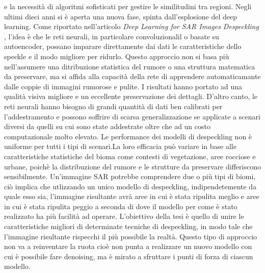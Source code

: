 e la necessità di algoritmi sofisticati per gestire le similitudini tra regioni. Negli ultimi dieci 
anni si è aperta una nuova fase, spinta dall'esplosione del deep learning. Come riportato nell'articolo 
\textit{Deep Learning for SAR Images Despeckling} \cite{DL_SAR}, l'idea è che le reti neurali, in 
particolare convoluzionalil o basate su autoencoder, possano imparare direttamente dai dati le caratteristiche
dello speckle e il modo migliore per ridurlo. Questo approccio non si basa più nell'assumere una ditribuzione 
statistica del rumore o una struttura matematica da preservare, ma si affida alla capacità della rete di 
apprendere automaticamante dalle coppie di immagini rumorose e pulite. I risultati hanno portato ad una qualità 
visiva migliore e un eccellente preservazione dei dettagli. D'altro canto, le reti neurali hanno bisogno 
di grandi quantità di dati ben calibrati per l'addestramento e possono soffrire di scarsa generalizzazione se 
applicate a scenari diversi da quelli su cui sono state addestrate oltre che ad un costo computazionale molto elevato. Le performance dei modelli di despeckling non è uniforme per tutti i tipi di scenari.La loro efficacia può variare
in base alle caratteristiche statistiche del bioma come contesti di vegetazione, aree rocciose e urbane, 
poichè la distribuzione del rumore e le strutture da preservare differiscono sensibilmente. Un'immagine SAR potrebbe 
comprendere due o più tipi di biomi, ciò implica che utlizzando un unico modello di despeckling, 
indipendetemente da quale esso sia, l'immagine risultante avrà aree in cui è stata ripulita meglio e aree in cui è 
stata ripulita peggio a seconda di dove il modello per come è stato realizzato ha più facilità ad operare.
L'obiettivo della tesi è quello di unire le caratteristiche migliori di determinate tecniche di despeckling, 
in modo tale che l'immagine risultante rispecchi il più possibile la realtà. Questo tipo di approccio non va a 
reinventare la ruota cioè non punta a realizzare un nuovo modello con cui è possibile fare denoising, ma è mirato
a sfruttare i punti di forza di ciascun modello. 